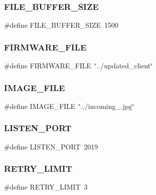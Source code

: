 \mbox{\label{server_2main_8c_a09dbbd73a84cf772b421c6024b65b1fd}} 
\subsubsection{FILE\_BUFFER\_SIZE}
{\footnotesize\ttfamily \#define F\+I\+L\+E\+\_\+\+B\+U\+F\+F\+E\+R\+\_\+\+S\+I\+ZE~1500}

\mbox{\label{server_2main_8c_a6ef7baa1d4325116155fe508770ec911}} 
\subsubsection{FIRMWARE\_FILE}
{\footnotesize\ttfamily \#define F\+I\+R\+M\+W\+A\+R\+E\+\_\+\+F\+I\+LE~\char`\"{}../updated\+\_\+client\char`\"{}}

\mbox{\label{server_2main_8c_ade64ea695c038c15864c1e6fd5d69c03}} 
\subsubsection{IMAGE\_FILE}
{\footnotesize\ttfamily \#define I\+M\+A\+G\+E\+\_\+\+F\+I\+LE~\char`\"{}../incoming\+\_.\+jpg\char`\"{}}

\mbox{\label{server_2main_8c_a4fba0963c20988d1f1a45afb1c636e44}} 
\subsubsection{LISTEN\_PORT}
{\footnotesize\ttfamily \#define L\+I\+S\+T\+E\+N\+\_\+\+P\+O\+RT~2019}

\mbox{\label{server_2main_8c_ad4eba3b0ea03f397bae8792d0f0e4cd4}} 
\subsubsection{RETRY\_LIMIT}
{\footnotesize\ttfamily \#define R\+E\+T\+R\+Y\+\_\+\+L\+I\+M\+IT~3}

\mbox{\label{server_2main_8c_adbe6c60fb689b6eb1c165dda1b4ccda1}} 
